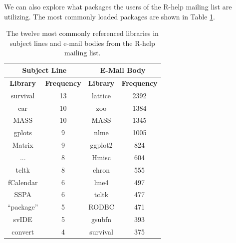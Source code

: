 \documentclass[12pt, a4paper, oneside]{amsart}
\begin{document}
We can also explore what packages the users of the R-help mailing list are utilizing.  The most commonly loaded packages are shown in Table \ref{table:allLibs}.

 \begin{table}[ht]
 \centering
 \begin{tabular}{|c|c||c|c|}
 \hline
\multicolumn{2}{|c||}{Subject Line} & \multicolumn{2}{|c|}{E-Mail Body}\\
\hline
\footnotesize{\textbf{Library}}& \footnotesize{\textbf{Frequency}} & \footnotesize{\textbf{Library}}& \footnotesize{\textbf{Frequency}}\\
\hline
survival & 13 & lattice & 2392 \\
car &10 & zoo & 1384\\
MASS & 10 & MASS & 1345\\
gplots & 9 & nlme & 1005\\
Matrix & 9 & ggplot2 & 824\\
... & 8 & Hmisc & 604\\
tcltk & 8 & chron & 555\\
fCalendar & 6 & lme4 & 497\\
SSPA & 6 & tcltk & 477\\
``package'' & 5 & RODBC & 471\\
svIDE & 5 & gsubfn & 393\\
convert & 4 & survival & 375\\
\hline
\end{tabular}
\caption{The twelve most commonly referenced libraries in subject lines and e-mail bodies from the R-help mailing list.}
\label{table:allLibs}
\end{table} 





\newpage
\end{document}
